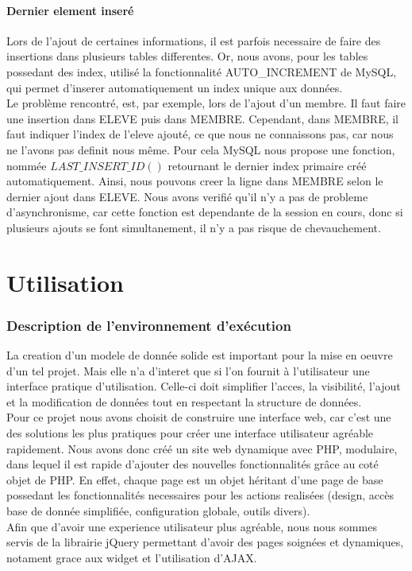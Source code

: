 \documentclass[a4paper, 11pt]{article}
\begin{document}
\subsection{Dernier element inseré}
Lors de l'ajout de certaines informations, il est parfois necessaire de faire des insertions dans plusieurs tables differentes. Or, nous avons, pour les tables possedant des index, utilisé la fonctionnalité AUTO\_INCREMENT de MySQL, qui permet d'inserer automatiquement un index unique aux données. 
\\Le problème rencontré, est, par exemple, lors de l'ajout d'un membre. Il faut faire une insertion dans ELEVE puis dans MEMBRE. Cependant, dans MEMBRE, il faut indiquer l'index de l'eleve ajouté, ce que nous ne connaissons pas, car nous ne l'avons pas definit nous même. Pour cela MySQL nous propose une fonction, nommée $LAST\_INSERT\_ID()$ retournant le dernier index primaire créé automatiquement. Ainsi, nous pouvons creer la ligne dans MEMBRE selon le dernier ajout dans ELEVE. Nous avons verifié qu'il n'y a pas de probleme d'asynchronisme, car cette fonction est dependante de la session en cours, donc si plusieurs ajouts se font simultanement, il n'y a pas risque de chevauchement.

\newpage
\part{Utilisation}
\setcounter{section}{0}
\section{Description de l'environnement d'exécution}
La creation d'un modele de donnée solide est important pour la mise en oeuvre d'un tel projet. Mais elle n'a d'interet que si l'on fournit à l'utilisateur une interface pratique d'utilisation. Celle-ci doit simplifier l'acces, la visibilité, l'ajout et la modification de données tout en respectant la structure de données.
\\Pour ce projet nous avons choisit de construire une interface web, car c'est une des solutions les plus pratiques pour créer une interface utilisateur agréable rapidement. Nous avons donc créé un site web dynamique avec PHP, modulaire, dans lequel il est rapide d'ajouter des nouvelles fonctionnalités grâce au coté objet de PHP. En effet, chaque page est un objet héritant d'une page de base possedant les fonctionnalités necessaires pour les actions realisées (design, accès base de donnée simplifiée, configuration globale, outils divers). 
\\Afin que d'avoir une experience utilisateur plus agréable, nous nous sommes servis de la librairie jQuery permettant d'avoir des pages soignées et dynamiques, notament grace aux widget et l'utilisation d'AJAX. 
\end{document}
